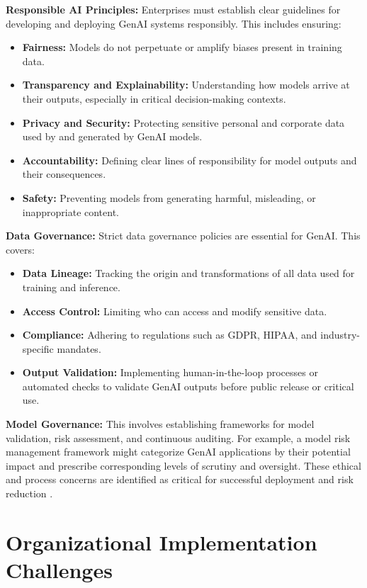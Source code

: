 \documentclass{article}
\begin{document}
\textbf{Responsible AI Principles:} Enterprises must establish clear guidelines for developing and deploying GenAI systems responsibly. This includes ensuring:
\begin{itemize}
  \item \textbf{Fairness:} Models do not perpetuate or amplify biases present in training data.
  \item \textbf{Transparency and Explainability:} Understanding how models arrive at their outputs, especially in critical decision-making contexts.
  \item \textbf{Privacy and Security:} Protecting sensitive personal and corporate data used by and generated by GenAI models.
  \item \textbf{Accountability:} Defining clear lines of responsibility for model outputs and their consequences.
  \item \textbf{Safety:} Preventing models from generating harmful, misleading, or inappropriate content.
\end{itemize}

\textbf{Data Governance:} Strict data governance policies are essential for GenAI. This covers:
\begin{itemize}
  \item \textbf{Data Lineage:} Tracking the origin and transformations of all data used for training and inference.
  \item \textbf{Access Control:} Limiting who can access and modify sensitive data.
  \item \textbf{Compliance:} Adhering to regulations such as GDPR, HIPAA, and industry-specific mandates.
  \item \textbf{Output Validation:} Implementing human-in-the-loop processes or automated checks to validate GenAI outputs before public release or critical use.
\end{itemize}

\textbf{Model Governance:} This involves establishing frameworks for model validation, risk assessment, and continuous auditing. For example, a model risk management framework might categorize GenAI applications by their potential impact and prescribe corresponding levels of scrutiny and oversight. These ethical and process concerns are identified as critical for successful deployment and risk reduction \cite{openalex_w4400993506}.


\section{Organizational Implementation Challenges}
\end{document}
